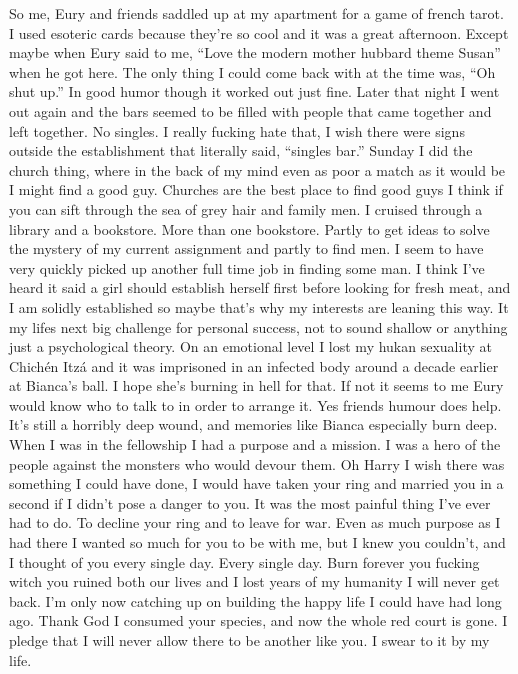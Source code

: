 So me, Eury and friends saddled up at my apartment for a game of french tarot. I used esoteric cards because they're so cool and it was a great afternoon. Except maybe when Eury said to me, ``Love the modern mother hubbard theme Susan'' when he got here. The only thing I could come back with at the time was, ``Oh shut up.'' In good humor though it worked out just fine. Later that night I went out again and the bars seemed to be filled with people that came together and left together. No singles. I really fucking hate that, I wish there were signs outside the establishment that literally said, ``singles bar.'' Sunday I did the church thing, where in the back of my mind even as poor a match as it would be I might find a good guy. Churches are the best place to find good guys I think if you can sift through the sea of grey hair and family men. I cruised through a library and a bookstore. More than one bookstore. Partly to get ideas to solve the mystery of my current assignment and partly to find men. I seem to have very quickly picked up another full time job in finding some man. I think I've heard it said a girl should establish herself first before looking for fresh meat, and I am solidly established so maybe that's why my interests are leaning this way. It my lifes next big challenge for personal success, not to sound shallow or anything just a psychological theory. On an emotional level I lost my hukan sexuality at Chich\'{e}n Itz\'{a} and it was imprisoned in an infected body around a decade earlier at Bianca's ball. I hope she's burning in hell for that. If not it seems to me Eury would know who to talk to in order to arrange it. Yes friends humour does help. It's still a horribly deep wound, and memories like Bianca especially burn deep. When I was in the fellowship I had a purpose and a mission. I was a hero of the people against the monsters who would devour them. Oh Harry I wish there was something I could have done, I would have taken your ring and married you in a second if I didn't pose a danger to you. It was the most painful thing I've ever had to do. To decline your ring and to leave for war. Even as much purpose as I had there I wanted so much for you to be with me, but I knew you couldn't, and I thought of you every single day. Every single day. Burn forever you fucking witch you ruined both our lives and I lost years of my humanity I will never get back. I'm only now catching up on building the happy life I could have had long ago. Thank God I consumed your species, and now the whole red court is gone. I pledge that I will never allow there to be another like you. I swear to it by my life.

